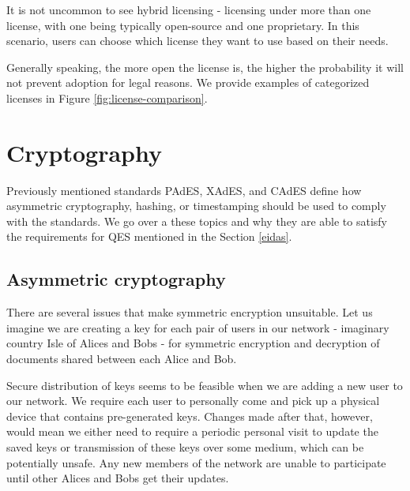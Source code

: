 \documentclass[thesismargins, english, thesislinespacing, onelinechapterstyle, upjsfrontpage]{rnthesis}
\begin{document}
It is not uncommon to see hybrid licensing - licensing under more than one license, with one being typically open-source and one proprietary.
In this scenario, users can choose which license they want to use based on their needs.


\iffalse %
As we have already mentioned, software licenses can influence whether and how it can be used as a part of different software.
Both when we are the ones using someone else's software and when someone else is using our software.
\fi
Generally speaking, the more open the license is, the higher the probability it will not prevent adoption for legal reasons.
We provide examples of categorized licenses in Figure \ref{fig:license-comparison}.

\iffalse %
Various possible combinations can be seen in Figure \ref{fig:license-compatibility}, where greyed out options mean such combination is not possible unless a separate licensing agreement is reached with the copyright owner.


\obrazok{./figures/license-compatibility}{Schematic representation of license directionality. \osoba{Morin 2012} \cite{licensing}}{license-compatibility}
\fi

\section{Cryptography} \label{cryptography}

Previously mentioned standards PAdES, XAdES, and CAdES define how asymmetric cryptography, hashing, or timestamping should be used to comply with the standards.
We go over a these topics and why they are able to satisfy the requirements for QES mentioned in the Section \ref{eidas}.

\subsection{Asymmetric cryptography}

There are several issues that make symmetric encryption unsuitable.
Let us imagine we are creating a key for each pair of users in our network - imaginary country Isle of Alices and Bobs - for symmetric encryption and decryption of documents shared between each Alice and Bob.

Secure distribution of keys seems to be feasible when we are adding a new user to our network.
We require each user to personally come and pick up a physical device that contains pre-generated keys.
Changes made after that, however, would mean we either need to require a periodic personal visit to update the saved keys or transmission of these keys over some medium, which can be potentially unsafe.
Any new members of the network are unable to participate until other Alices and Bobs get their updates.
\end{document}
